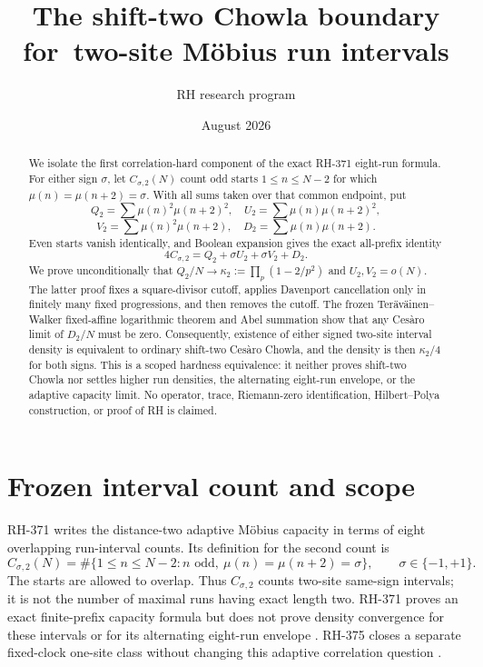 \documentclass[11pt]{article}
\title{The shift-two Chowla boundary for\
two-site M\"obius run intervals}
\author{RH research program}
\date{August 2026}
\theoremstyle{definition}
\theoremstyle{remark}
\newcommand{\Mob}{\mu}
\begin{document}
\maketitle

\begin{abstract}
We isolate the first correlation-hard component of the exact RH-371
eight-run formula.  For either sign $\sigma$, let $C_{\sigma,2}(N)$ count
odd starts $1\le n\le N-2$ for which
$\mu(n)=\mu(n+2)=\sigma$.  With all sums taken over that common endpoint,
put
\[
 Q_2=\sum\mu(n)^2\mu(n+2)^2,\quad
 U_2=\sum\mu(n)\mu(n+2)^2,
\]
\[
 V_2=\sum\mu(n)^2\mu(n+2),\quad
 D_2=\sum\mu(n)\mu(n+2).
\]
Even starts vanish identically, and Boolean expansion gives the exact
all-prefix identity
\[
 4C_{\sigma,2}=Q_2+\sigma U_2+\sigma V_2+D_2.
\]
We prove unconditionally that
$Q_2/N\to\kappa_2:=\prod_p(1-2/p^2)$ and
$U_2,V_2=o(N)$.  The latter proof fixes a square-divisor cutoff, applies
Davenport cancellation only in finitely many fixed progressions, and then
removes the cutoff.  The frozen Ter\"av\"ainen--Walker fixed-affine
logarithmic theorem and Abel summation show that any Ces\`aro limit of
$D_2/N$ must be zero.  Consequently, existence of either signed two-site
interval density is equivalent to ordinary shift-two Ces\`aro Chowla, and
the density is then $\kappa_2/4$ for both signs.  This is a scoped hardness
equivalence: it neither proves shift-two Chowla nor settles higher run
densities, the alternating eight-run envelope, or the adaptive capacity
limit.  No operator, trace, Riemann-zero identification, Hilbert--Polya
construction, or proof of RH is claimed.
\end{abstract}

\section{Frozen interval count and scope}

RH-371 writes the distance-two adaptive M\"obius capacity in terms of eight
overlapping run-interval counts.  Its definition for the second count is
\begin{equation}
 C_{\sigma,2}(N)
 =\#\{1\le n\le N-2:n\text{ odd},\
        \Mob(n)=\Mob(n+2)=\sigma\},
 \qquad \sigma\in\{-1,+1\}.
 \label{eq:C-definition}
\end{equation}
The starts are allowed to overlap.  Thus $C_{\sigma,2}$ counts two-site
same-sign intervals; it is not the number of maximal runs having exact
length two.  RH-371 proves an exact finite-prefix capacity formula but does
not prove density convergence for these intervals or for its alternating
eight-run envelope \cite{RH371}.  RH-375 closes a separate fixed-clock
one-site class without changing this adaptive correlation question
\cite{RH375}.
\end{document}
